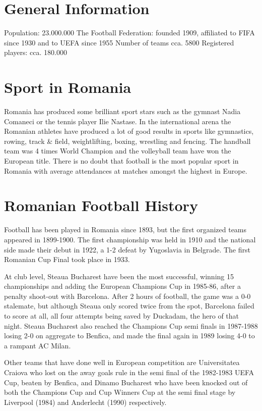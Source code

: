 \section{General Information}
Population: 23.000.000\newline
The Football Federation: founded 1909, affiliated to FIFA  since 1930 and to UEFA since 1955\newline
Number of teams cca. 5800\newline
Registered players: cca. 180.000\newline
\section{Sport in Romania}
Romania has produced some brilliant sport stars such as the gymnast Nadia 
Comaneci or the tennis player Ilie Nastase. In the international arena the
Romanian athletes have produced a lot of good results in sports like 
gymnastics, rowing, track \& field, weightlifting, boxing, wrestling and
fencing. The handball team was 4 times World Champion and the volleyball team
have won the European title. There is no doubt that football is the most 
popular sport in Romania with average attendances at matches amongst the 
highest in Europe.
\section{Romanian Football History}
Football has been played in Romania since 1893, but the first organized teams 
appeared in 1899-1900. The first championship was held in 1910 and the national
side made their debut in 1922, a 1-2 defeat by Yugoslavia in Belgrade. The 
first Romanian Cup Final took place in 1933.

At club level, Steaua Bucharest have been the most successful, winning 15 
championships and adding the European Champions Cup in 1985-86, after  a
penalty shoot-out with Barcelona. After 2 hours of football, the game was a 0-0
stalemate, but although Steaua only scored twice from the spot, Barcelona
failed to score at all, all four attempts being saved by Duckadam, the hero
of that night. Steaua Bucharest also reached the Champions Cup semi finals in
1987-1988 losing 2-0 on aggregate to Benfica, and made the final again in 1989
losing 4-0 to a rampant AC Milan.

Other teams that have done well in European competition are Universitatea 
Craiova who lost on the away goals rule in the semi final of the 1982-1983 
UEFA Cup, beaten by Benfica, and Dinamo Bucharest who have been knocked out of
both the Champions Cup and Cup Winners Cup at the semi final stage by 
Liverpool (1984) and Anderlecht (1990) respectively.

